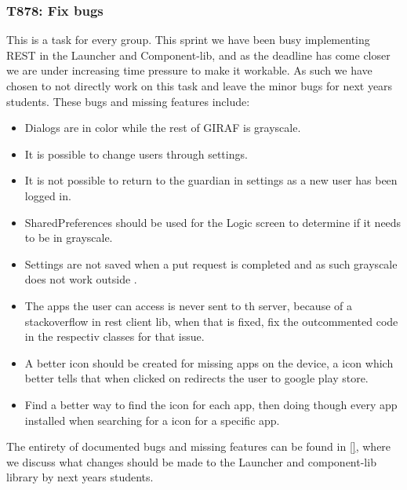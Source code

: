 
\subsubsection{T878: Fix bugs}
This is a task for every group. This sprint we have been busy implementing REST
in the Launcher and Component-lib, and as the deadline has come closer we are
under increasing time pressure to make it workable. As such we have chosen to
not directly work on this task and leave the minor bugs for next years students.
These bugs and missing features include:

\begin{itemize}
  \item Dialogs are in color while the rest of GIRAF is grayscale.
  \item It is possible to change users through settings.
  \item It is not possible to return to the guardian in settings as a new user
  has been logged in.
  \item SharedPreferences should be used for the Logic screen to determine if
  it needs to be in grayscale.
  \item Settings are not saved when a put request is completed and as such
  grayscale does not work outside .
  \item The apps the user can access is never sent to th server, because of a
  stackoverflow in rest client lib, when that is fixed, fix the outcommented
  code in the respectiv classes for that issue.
  \item A better icon should be created for missing apps on the device, a icon
  which better tells that when clicked on redirects the user to google play
  store.
  \item Find a better way to find the icon for each app, then doing though every
  app installed when searching for a icon for a specific app.
\end{itemize}

The entirety of documented bugs and missing features can be found in \autoref{},
where we discuss what changes should be made to the Launcher and component-lib
library by next years students.



